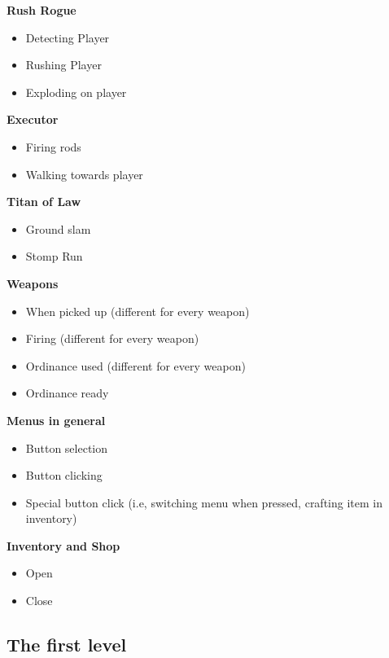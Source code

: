 \documentclass[../Main.tex]{subfiles}
\begin{document}
\textbf{Rush Rogue}
\begin{itemize}
	\item Detecting Player
	\item Rushing Player
	\item Exploding on player
\end{itemize}

\textbf{Executor}
\begin{itemize}
	\item Firing rods
	\item Walking towards player
\end{itemize}

\textbf{Titan of Law}
\begin{itemize}
	\item Ground slam
	\item Stomp Run
\end{itemize}

\textbf{Weapons}
\begin{itemize}
	\item When picked up (different for every weapon)
	\item Firing (different for every weapon)
	\item Ordinance used (different for every weapon)
	\item Ordinance ready
\end{itemize}

\textbf{Menus in general}
\begin{itemize}
	\item Button selection
	\item Button clicking
	\item Special button click (i.e, switching menu when pressed, crafting item in inventory)
\end{itemize}


\textbf{Inventory and Shop}
\begin{itemize}
	\item Open
	\item Close
\end{itemize}

\subsection{The first level}
\end{document}
